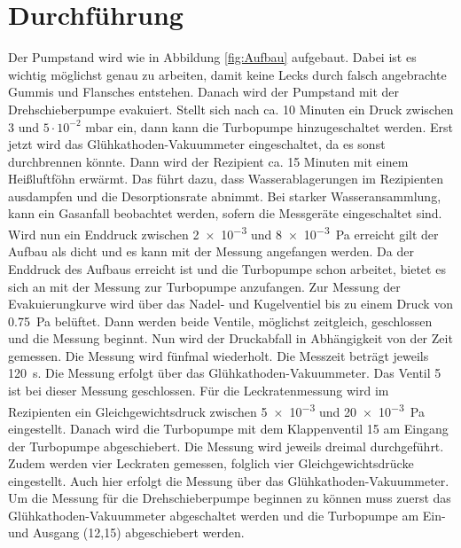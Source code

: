 \section{Durchführung}
\label{sec:Durchführung}
Der Pumpstand wird wie in Abbildung \ref{fig:Aufbau} aufgebaut. Dabei ist es wichtig möglichst genau 
zu arbeiten, damit keine Lecks durch falsch angebrachte Gummis und Flansches entstehen. Danach wird 
der Pumpstand mit der Drehschieberpumpe evakuiert. Stellt sich nach ca. 10 Minuten ein Druck 
zwischen 3 und $5\cdot 10^{-2}$ mbar ein, dann kann die Turbopumpe hinzugeschaltet werden. 
Erst jetzt wird das Glühkathoden-Vakuummeter eingeschaltet, da es sonst durchbrennen könnte.
Dann wird der Rezipient ca. 15 Minuten mit einem Heißluftföhn erwärmt. Das 
führt dazu, dass Wasserablagerungen im Rezipienten ausdampfen und die Desorptionsrate 
abnimmt. Bei starker Wasseransammlung, kann ein Gasanfall beobachtet werden, sofern die 
Messgeräte eingeschaltet sind. Wird nun ein Enddruck zwischen \SI{2e-3}{} und \SI{8e-3}{\pascal} 
erreicht gilt der Aufbau als dicht und es kann mit der Messung angefangen werden.
\newline
\newline
Da der Enddruck des Aufbaus erreicht ist und die Turbopumpe schon arbeitet, bietet es sich an 
mit der Messung zur Turbopumpe anzufangen. Zur Messung der Evakuierungkurve wird über das 
Nadel- und Kugelventiel bis zu einem Druck von \SI{0.75}{\pascal} belüftet. Dann werden beide 
Ventile, möglichst zeitgleich, geschlossen und die Messung beginnt. Nun wird der Druckabfall in 
Abhängigkeit von der Zeit gemessen. Die Messung wird fünfmal wiederholt. Die Messzeit beträgt 
jeweils \SI{120}{\second}. Die Messung erfolgt über das Glühkathoden-Vakuummeter. Das Ventil 5 
ist bei dieser Messung geschlossen.
\newline 
\newline 
Für die Leckratenmessung wird im Rezipienten ein Gleichgewichtsdruck zwischen \SI{5e-3}{} 
und \SI{20e-3}{\pascal} eingestellt. Danach wird die Turbopumpe mit dem Klappenventil 15 am Eingang 
der Turbopumpe abgeschiebert. Die Messung wird jeweils dreimal durchgeführt. Zudem werden 
vier Leckraten gemessen, folglich vier Gleichgewichtsdrücke eingestellt. Auch hier erfolgt die 
Messung über das Glühkathoden-Vakuummeter. 
\newline
\newline
Um die Messung für die Drehschieberpumpe beginnen zu können muss zuerst das Glühkathoden-Vakuummeter 
abgeschaltet werden und die Turbopumpe am Ein- und Ausgang (12,15) abgeschiebert werden. 
